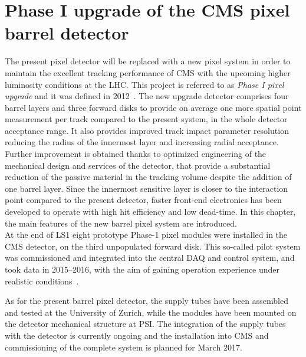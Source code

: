 \chapter{Phase I upgrade of the CMS pixel barrel detector}
\label{ch:Phase1Intro}

The present pixel detector will be replaced with a new pixel system in order to maintain the excellent tracking performance of CMS with the upcoming higher luminosity conditions at the LHC.
This project is referred to as \textit{Phase I pixel upgrade} and it was defined in 2012~\cite{Dominguez:1481838}. The new upgrade detector comprises four barrel layers and three forward disks to provide on average one more spatial point measurement per track compared to the present system, in the whole detector acceptance range. It also provides improved track impact parameter resolution reducing the radius of the innermost layer and increasing radial acceptance. 
Further improvement is obtained thanks to optimized engineering of the mechanical design and services of the detector, that provide a substantial reduction of the passive material in the tracking volume despite the addition of one barrel layer. Since the innermost sensitive layer is closer to the interaction point compared to the present detector, faster front-end electronics has been developed to operate with high hit efficiency and low dead-time.
In this chapter, the main features of the new barrel pixel system are introduced.\\

At the end of LS1 eight prototype Phase-1 pixel modules were installed in the CMS detector, on the third unpopulated forward disk. This so-called pilot system was commissioned and integrated into the central DAQ and control system, and took data in 2015--2016, with the aim of gaining operation experience under realistic conditions~\cite{Akgun:2015afw}.

As for the present barrel pixel detector, the supply tubes have been assembled and tested at the University of Zurich, while the modules have been mounted on the detector mechanical structure at PSI. The integration of the supply tubes with the detector is currently ongoing and the installation into CMS and commissioning of the complete system is planned for March 2017.

